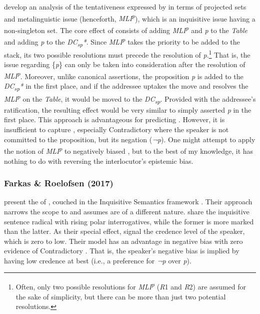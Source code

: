 \documentclass[output=paper,colorlinks,citecolor=brown]{langscibook}
\begin{document}
\citet{malamud2015three} develop an analysis of the tentativeness expressed by  in terms of projected  sets and metalinguistic issue (henceforth, \textit{MLI\textsuperscript{p}}), which is an inquisitive issue having a non-singleton set. The core effect of  consists of adding \textit{MLI\textsuperscript{p}} and \textit{p} to the \textit{Table} and adding \textit{p} to the \textit{DC\textsubscript{sp}*}. Since \textit{MLI\textsuperscript{p}} takes the priority to be added to the stack, its two possible resolutions must precede the resolution of \textit{p}.\footnote{Often, only two possible resolutions for \textit{MLI\textsuperscript{p}} (\textit{R}1 and \textit{R}2) are assumed for the sake of simplicity, but there can be more than just two potential resolutions.} That is, the issue regarding \{\textit{p}\} can only be taken into consideration after the resolution of \textit{MLI\textsuperscript{p}}. Moreover, unlike canonical assertions, the proposition \textit{p} is added to the \textit{DC\textsubscript{sp}*} in the first place, and if the addressee uptakes the move and resolves the \textit{MLI\textsuperscript{p}} on the \textit{Table}, it would be moved to the \textit{DC\textsubscript{sp}}. Provided with the addressee's ratification, the resulting effect would be very similar to simply asserted \textit{p} in the first place. This approach is advantageous for predicting . However, it is insufficient to capture , especially Contradictory  where the speaker is not committed to the proposition, but its negation (\textit{¬p}). One might attempt to apply the notion of \textit{MLI\textsuperscript{p}} to negatively biased , but to the best of my knowledge, it has nothing to do with reversing the interlocutor's epistemic bias.

\subsubsection{Farkas \& Roelofsen (2017)}
\label{sec:Farkas:Hong}

\citet{farkas2017division} present the  of , couched in the Inquisitive Semantics framework \citep{ciardelli2013inquisitive, ciardelli2018inquisitive}. Their approach narrows the scope to  and assumes  are of a different nature.  share the inquisitive sentence radical with rising polar interrogatives, while the former is more marked than the latter. As their special effect,  signal the credence level of the speaker, which is zero to low. Their model has an advantage in negative bias with zero evidence of Contradictory . That is, the speaker’s negative bias is implied by having low credence at best (i.e., a preference for \textit{¬p} over \textit{p}). 
\end{document}
